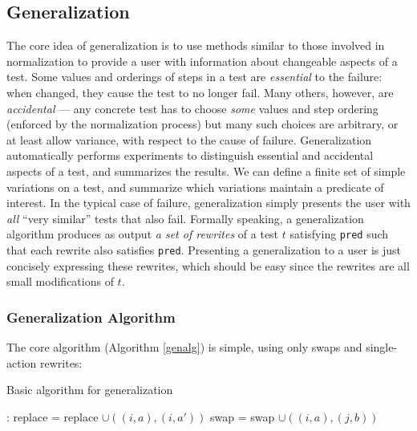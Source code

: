 \subsection{Generalization}



The core idea of generalization is to use methods similar to those
involved in normalization to provide a user with information about
changeable aspects of a test.  Some values and orderings of steps
in a test are \emph{essential} to the failure: when changed, they
cause the test to no longer fail.  Many others, however, are
\emph{accidental} --- any concrete test has to choose \emph{some}
values and step ordering (enforced by the normalization
process) but many such choices are arbitrary, or at least allow
variance, with respect to the cause of failure.  Generalization
automatically performs experiments to distinguish essential and accidental aspects
of a test, and summarizes the results.  We
can define a finite set of simple variations on a test, and summarize which
variations maintain a predicate of interest. In the typical case of
failure, generalization simply presents the user with \emph{all}
``very similar'' tests that also fail. Formally
speaking, a generalization algorithm produces as output \emph{a set of
  rewrites} of a test $t$ satisfying {\tt pred} such that each rewrite
also satisfies {\tt pred}.  Presenting a generalization to a user is just
concisely expressing these rewrites, which should
be easy since the rewrites are all small modifications of $t$.

\subsubsection{Generalization Algorithm}

The core algorithm
(Algorithm \ref{genalg}) is simple, using only swaps and single-action
rewrites:

\begin{algorithm}
\caption{Basic algorithm for generalization}
\label{genalg}
\begin{algorithmic}[1]
:
\State replace = replace $\cup ((i,a),(i,a'))$
\EndIf
\EndFor 
{}
\State swap = swap $\cup ((i,a),(j,b))$
\EndIf
\EndFor
\EndFor
{}
\end{algorithmic}
\end{algorithm}


